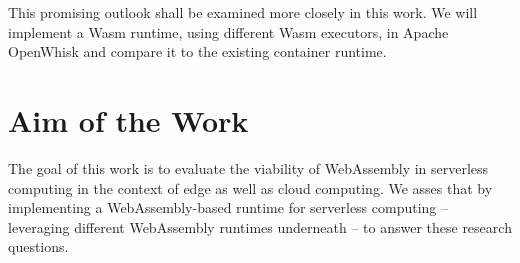 

This promising outlook shall be examined more closely in this work. We will implement a Wasm runtime, using different Wasm executors, in Apache OpenWhisk and compare it to the existing container runtime.

\section{Aim of the Work}

The goal of this work is to evaluate the viability of WebAssembly in serverless computing in the context of edge as well as cloud computing. We asses that by implementing a WebAssembly-based runtime for serverless computing -- leveraging different WebAssembly runtimes underneath -- to answer these research questions.

